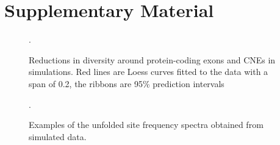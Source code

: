 \section{Supplementary Material}

\begin{figure}[H]
   \centering      
   \noindent{}
 \caption{Reductions in diversity around protein-coding exons and CNEs in simulations. Red lines are Loess curves fitted to the data with a span of 0.2, the ribbons are 95\% prediction intervals}.
 
 \label{fig:BGSLoess}
\end{figure}

\begin{figure}[H]
   \centering      
   \noindent{}
 \caption{Examples of the unfolded site frequency spectra obtained from simulated data.}.
 
 \label{fig:SFSexample}
\end{figure}








